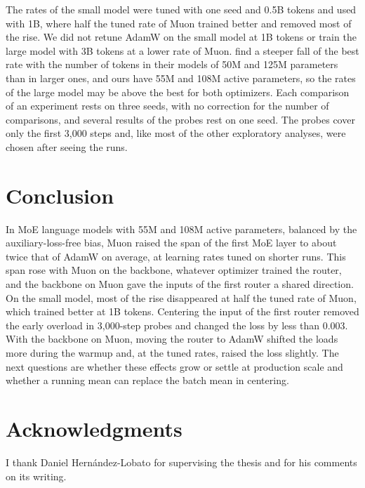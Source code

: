 \documentclass[11pt, a4paper]{article}
\begin{document}
The rates of the small model were tuned with one seed and 0.5B tokens and used with 1B, where half the tuned rate of Muon trained better and removed most of the rise. We did not retune AdamW on the small model at 1B tokens or train the large model with 3B tokens at a lower rate of Muon. \citet{bjorck2025horizons} find a steeper fall of the best rate with the number of tokens in their models of 50M and 125M parameters than in larger ones, and ours have 55M and 108M active parameters, so the rates of the large model may be above the best for both optimizers. Each comparison of an experiment rests on three seeds, with no correction for the number of comparisons, and several results of the probes rest on one seed. The probes cover only the first 3,000 steps and, like most of the other exploratory analyses, were chosen after seeing the runs.

\section{Conclusion}
\label{sec:conclusion}

In MoE language models with 55M and 108M active parameters, balanced by the auxiliary-loss-free bias, Muon raised the span of the first MoE layer to about twice that of AdamW on average, at learning rates tuned on shorter runs. This span rose with Muon on the backbone, whatever optimizer trained the router, and the backbone on Muon gave the inputs of the first router a shared direction. On the small model, most of the rise disappeared at half the tuned rate of Muon, which trained better at 1B tokens. Centering the input of the first router removed the early overload in 3,000-step probes and changed the loss by less than 0.003. With the backbone on Muon, moving the router to AdamW shifted the loads more during the warmup and, at the tuned rates, raised the loss slightly. The next questions are whether these effects grow or settle at production scale and whether a running mean can replace the batch mean in centering.

{\renewcommand{\sectionpage}{}\section*{Acknowledgments}}

I thank Daniel Hernández-Lobato for supervising the thesis and for his comments on its writing.



\appendix
\end{document}
